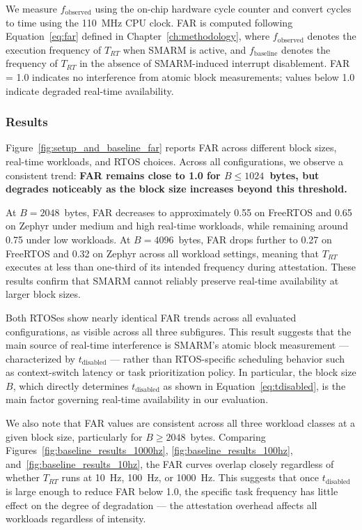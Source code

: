 \documentclass[a4paper,10pt]{article}
\begin{document}
{We measure $f_{\mathrm{observed}}$ using the on-chip hardware cycle counter 
and convert cycles to time using the 110~MHz CPU clock. FAR is computed following Equation~\ref{eq:far} defined in
Chapter~\ref{ch:methodology}, where $f_{\mathrm{observed}}$ denotes 
the execution frequency of $T_{RT}$ when SMARM is active, and 
$f_{\mathrm{baseline}}$ denotes the frequency of $T_{RT}$ in the absence 
of SMARM-induced interrupt disablement. FAR = 1.0 indicates no 
interference from atomic block measurements; values below 1.0 indicate 
degraded real-time availability.


\subsubsection{Results}

Figure~\ref{fig:setup_and_baseline_far} reports FAR across different block 
sizes, real-time workloads, and RTOS choices. Across all configurations, we 
observe a consistent trend: \textbf{FAR remains close to 1.0 for 
$B \leq 1024$~bytes, but degrades noticeably as the block size increases 
beyond this threshold.}

At $B = 2048$~bytes, FAR decreases to approximately 0.55 on FreeRTOS and 
0.65 on Zephyr under medium and high real-time workloads, while remaining 
around 0.75 under low workloads. At $B = 4096$~bytes, FAR drops further 
to 0.27 on FreeRTOS and 0.32 on Zephyr across all workload settings, 
meaning that $T_{RT}$ executes at less than one-third of its intended 
frequency during attestation. These results confirm that SMARM cannot 
reliably preserve real-time availability at larger block sizes.

Both RTOSes show nearly identical FAR trends across all 
evaluated configurations, as visible across all three subfigures. This 
result suggests that the main source of real-time interference is 
SMARM's atomic block measurement — characterized by $t_{\mathrm{disabled}}$ 
— rather than RTOS-specific scheduling behavior such as context-switch 
latency or task prioritization policy. In particular, the block size $B$, 
which directly determines $t_{\mathrm{disabled}}$ as shown in 
Equation~\ref{eq:tdisabled}, is the main factor governing 
real-time availability in our evaluation.

We also note that FAR values are consistent across all three workload 
classes at a given block size, particularly for $B \geq 2048$~bytes. 
Comparing Figures~\ref{fig:baseline_results_1000hz}, 
\ref{fig:baseline_results_100hz}, and~\ref{fig:baseline_results_10hz}, 
the FAR curves overlap closely regardless of whether $T_{RT}$ runs at 
10~Hz, 100~Hz, or 1000~Hz. This suggests that once $t_{\mathrm{disabled}}$ 
is large enough to reduce FAR below 1.0, the specific task frequency has 
little effect on the degree of degradation — the attestation overhead 
affects all workloads regardless of intensity.

}
\end{document}

